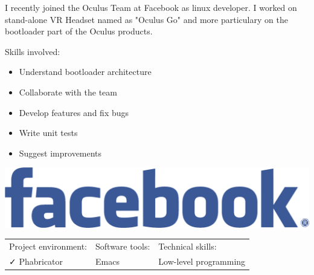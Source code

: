 \documentclass[letterpaper]{jm-cv} %
\begin{document}

\medskip
{}

\medskip
{}
\medskip

\small{


  I recently joined the Oculus Team at Facebook as linux developer.
  I worked on stand-alone VR Headset named as "Oculus Go" and more particulary on the bootloader part of the Oculus products.

  \vspace{0.2cm}
  \begin{minipage}{.7\textwidth}
      {\footnotesize\color{maingray}\bullet} Skills involved:
  \begin{itemize}
  \item[\color{mainblue}\faArrowRight] Understand bootloader architecture
  \item[\color{mainblue}\faArrowRight] Collaborate with the team
  \item[\color{mainblue}\faArrowRight] Develop features and fix bugs
  \item[\color{mainblue}\faArrowRight] Write unit tests
  \item[\color{mainblue}\faArrowRight] Suggest improvements
  \end{itemize}
  \end{minipage}%
  \begin{minipage}{.3\textwidth}
    \center
    \includegraphics[scale=0.06]{logo-facebook.png}
  \end{minipage}
  \vspace{0.2cm}

  \begin{tabular}{ l l l }
    Project environment: & \hspace{1cm}Software tools: & \hspace{1cm}Technical skills:\\
    {\color{mainblue}\faCheck} Phabricator &
    \hspace{1cm}{\color{maingreen}\faCheck} Emacs &
    \hspace{1cm}{\color{maingray}\faCheck} Low-level programming\\


\end{tabular}}
\end{document}
